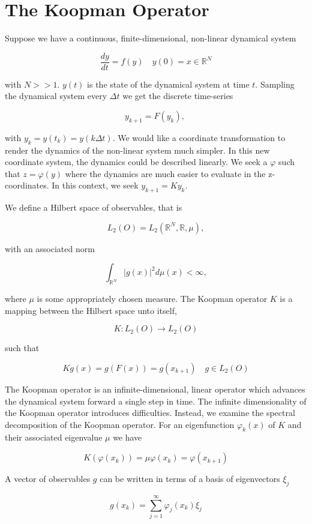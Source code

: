 \section{The Koopman Operator}
Suppose we have a continuous, finite-dimensional, non-linear dynamical system 

$$
\frac{dy}{dt} = f(y) \quad y(0) = x \in \mathbb{R}^N
$$

\noindent with $N>>1$. $y(t)$ is the state of the dynamical system at time $t$. Sampling the dynamical
system every $\Delta t$ we get the discrete time-series

$$
y_{k+1} = F(y_k),\
$$

\noindent with $y_k = y(t_k) = y(k \Delta t)$. We would like a coordinate transformation to render the dynamics of the
 non-linear system much simpler. In this new coordinate system, the dynamics could be
described linearly. We seek a $\varphi$ such
that $z = \varphi(y)$ where the dynamics are much easier to evaluate in the
 z-coordinates. In this context, we seek $y_{k+1} = Ky_k$.


 \noindent We define a Hilbert space of observables, that is 

$$
L_2(O) = L_2(\mathbb{R}^N, \mathbb{R}, \mu),
$$

\noindent with an associated norm 

$$
\int_{\mathbb{R}^N} |g(x) |^2 d\mu(x)  < \infty,
$$

\noindent where $\mu$ is some appropriately chosen measure. The Koopman
operator $K$ is a mapping between the Hilbert space unto itself,

$$
K: L_2(O) \rightarrow L_2(O)
$$

\noindent such that

$$
Kg(x) = g(F(x)) = g(x_{k+1}) \quad g \in L_2(O)
$$

The Koopman operator is an infinite-dimensional, linear operator which advances
the dynamical system forward a single step in time. The infinite dimensionality
of the Koopman operator introduces difficulties. Instead, we examine
the spectral decomposition of the Koopman operator. For an eigenfunction $\varphi_k(x)$ of $K$ and their associated eigenvalue $\mu$ we have 


$$
K(\varphi(x_k)) = \mu \varphi(x_k) = \varphi(x_{k+1})
$$

\noindent  A vector of observables $g$ can be written in terms of a basis of eigenvectors $\xi_j$

$$
g(x_{k}) = \sum^{\infty}_{j=1}\varphi_j(x_k) \xi_j
$$

